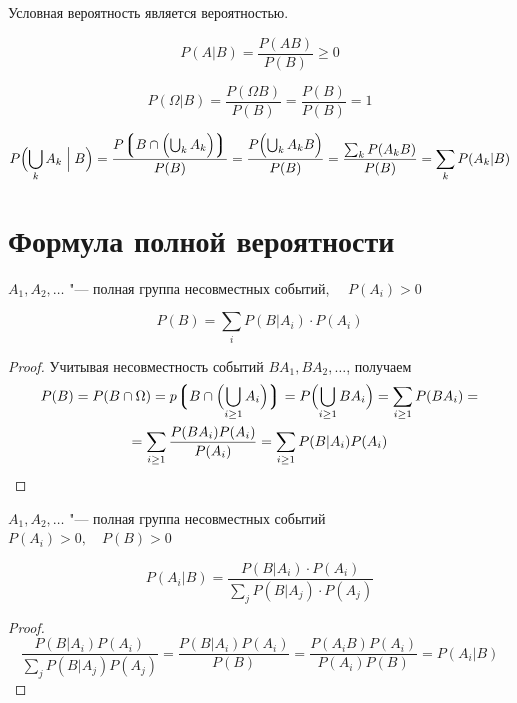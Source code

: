 \begin{statement}
	Условная вероятность является вероятностью.
\end{statement}

\begin{eproof}
\item
	$$ P(A|B) = \frac{P(AB)}{P(B)} \ge 0 $$
\item
	$$ P(\Omega|B) = \frac{P(\Omega B)}{P(B)} = \frac{P(B)}{P(B)} = 1 $$
\item
	$$ P \Bigl( \bigcup_k A_k \Bigm| B \Bigr) =
	\frac{P \Bigl\lgroup B \cap \Bigl( \bigcup_k A_k \Bigr) \Bigr\rgroup}{P(B)} =
	\frac{P \Bigl( \bigcup_k A_kB \Bigr)}{P(B)} =
	\frac{\sum_k P(A_kB)}{P(B)} = \sum_k P(A_k|B) $$
\end{eproof}

\section{Формула полной вероятности}

\begin{theorem}
	$ A_1, A_2, \dotsc $ "--- полная группа несовместных событий, $ \quad P(A_i) > 0 $

	$$ P(B) = \sum_i P(B|A_i) \cdot P(A_i) $$
\end{theorem}

\begin{proof}
	Учитывая несовместность событий $ BA_1, BA_2, \dotsc $, получаем
	\begin{multline*}
		P(B) = P(B \cap \Omega) =
		p \Bigl\lgroup B \cap \Bigl( \bigcup_{i \ge 1}A_i \Bigr) \Bigr\rgroup =
		P \Bigl( \bigcup_{i \ge 1} BA_i \Bigr) = \sum_{i \ge 1} P(BA_i) = \\
		= \sum_{i \ge 1} \frac{P(BA_i)P(A_i)}{P(A_i)} = \sum_{i \ge 1} P(B|A_i) P(A_i)
	\end{multline*}
\end{proof}

\begin{theorem}
	$ A_1, A_2, \dotsc $ "--- полная группа несовместных событий \\
	$ P(A_i) > 0, \quad P(B) > 0 $

	$$ P(A_i|B) = \frac{P(B|A_i) \cdot P(A_i)}{\sum_j P(B|A_j) \cdot P(A_j)} $$
\end{theorem}

\begin{proof}
	$$ \frac{P(B|A_i)P(A_i)}{\sum_j P(B|A_j)P(A_j)} = \frac{P(B|A_i)P(A_i)}{P(B)} =
	\frac{P(A_iB)P(A_i)}{P(A_i)P(B)} = P(A_i|B) $$
\end{proof}

